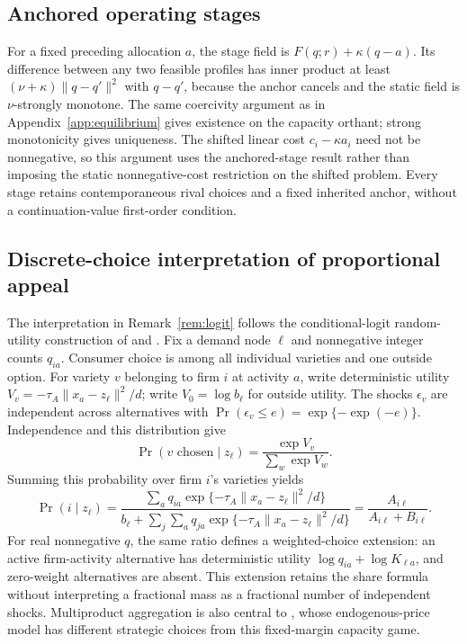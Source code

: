 \subsection{Anchored operating stages}\label{app:anchored-stage}

For a fixed preceding allocation $a$, the stage field is
$F(q;r)+\kappa(q-a)$.
Its difference between any two feasible profiles has inner product at least
$(\nu+\kappa)\|q-q'\|^2$ with $q-q'$, because the anchor cancels and the
static field is $\nu$-strongly monotone.
The same coercivity argument as in Appendix~\ref{app:equilibrium} gives
existence on the capacity orthant; strong monotonicity gives uniqueness.
The shifted linear cost $c_i-\kappa a_i$ need not be nonnegative, so this
argument uses the anchored-stage result rather than imposing the static
nonnegative-cost restriction on the shifted problem.
Every stage retains contemporaneous rival choices and a fixed inherited
anchor, without a continuation-value first-order condition.

\subsection{Discrete-choice interpretation of proportional
appeal}\label{app:logit}

The interpretation in Remark~\ref{rem:logit} follows the conditional-logit
random-utility construction of
\citet{mcfadden_conditional_logit_1974} and
\citet{train_discrete_choice_2009}.
Fix a demand node $\ell$ and nonnegative integer counts $q_{ia}$.
Consumer choice is among all individual varieties and one outside option.
For variety $v$ belonging to firm $i$ at activity $a$, write deterministic
utility $V_v=-\tau_A\|x_a-z_\ell\|^2/d$; write $V_0=\log b_\ell$ for
outside utility.
The shocks $\epsilon_v$ are independent across alternatives with
$\Pr(\epsilon_v\leq e)=\exp\{-\exp(-e)\}$.
Independence and this distribution give
\begin{equation}\label{eq:logit-choice}
  \Pr(v\text{ chosen}\mid z_\ell)
  =\frac{\exp V_v}{\sum_w\exp V_w}.
\end{equation}
Summing this probability over firm $i$'s varieties yields
\begin{equation}\label{eq:logit-firm-share}
  \Pr(i\mid z_\ell)
  =\frac{\sum_a q_{ia}\exp\{-\tau_A\|x_a-z_\ell\|^2/d\}}
  {b_\ell+\sum_j\sum_a q_{ja}\exp\{-\tau_A\|x_a-z_\ell\|^2/d\}}
  =\frac{A_{i\ell}}{A_{i\ell}+B_{i\ell}}.
\end{equation}
For real nonnegative $q$, the same ratio defines a weighted-choice
extension: an active firm-activity alternative has deterministic utility
$\log q_{ia}+\log K_{\ell a}$, and zero-weight alternatives are absent.
This extension retains the share formula without interpreting a fractional
mass as a fractional number of independent shocks.
Multiproduct aggregation is also central to
\citet{nocke_schutz_aggregative_2018}, whose endogenous-price model
has different strategic choices from this fixed-margin capacity game.

